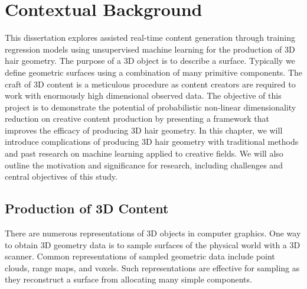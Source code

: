 \documentclass[ %
author={Dillon Keith Diep},
supervisor={Dr. Carl Henrik Ek},
degree={MEng},
title={ART-CG Hair:},
subtitle={Assisted Real-time Content Generation of Stylised Virtual Hair},
type={Research},
year={2017} ]{dissertation}
\begin{document}
\mainmatter


\chapter{Contextual Background}
\label{chap:context}
This dissertation explores assisted real-time content generation through training regression models using unsupervised machine learning for the production of 3D hair geometry.
The purpose of a 3D object is to describe a surface. Typically we define geometric surfaces using a combination of many primitive components. The craft of 3D content is a meticulous procedure as content creators are required to work with enormously high dimensional observed data.
The objective of this project is to demonstrate the potential of probabilistic non-linear dimensionality reduction on creative content production by presenting a framework that improves the efficacy of producing 3D hair geometry. 
In this chapter, we will introduce complications of producing 3D hair geometry with traditional methods and past research on machine learning applied to creative fields. We will also outline the motivation and significance for research, including challenges and central objectives of this study.

\section{Production of 3D Content}
There are numerous representations of 3D objects in computer graphics. One way to obtain 3D geometry data is to sample surfaces of the physical world with a 3D scanner. Common representations of sampled geometric data include point clouds, range maps, and voxels. Such representations are effective for sampling as they reconstruct a surface from allocating many simple components.
\end{document}
